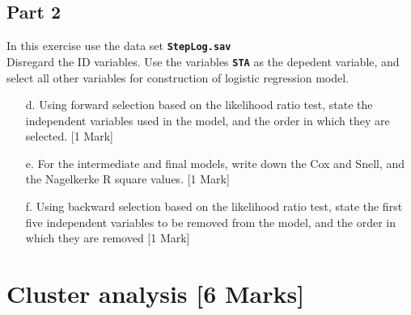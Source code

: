 \documentclass[12pt, a4paper]{article}
\theoremstyle{plain}
\theoremstyle{definition}
\theoremstyle{remark}
\begin{document}
\subsection{Part 2}
In this exercise use the data set \textbf{\texttt{StepLog.sav}}\\
Disregard the ID variables. Use the variables \textbf{\texttt{STA}} as the depedent variable, and select all other variables for construction of logistic regression model.
\begin{itemize}
\item[d.] Using forward selection based on the likelihood ratio test, state the independent variables used in the model, and the order in which they are selected. [1 Mark]
\item[e.] For the intermediate and final models, write down the Cox and Snell, and the Nagelkerke R square values. [1 Mark] %
\item[f.] Using backward selection based on the likelihood ratio test, state the first five independent variables to be removed from the model, and the order in which they are removed [1 Mark]
\end{itemize}
%

\newpage
\section{Cluster analysis [6 Marks]} %
\end{document}
